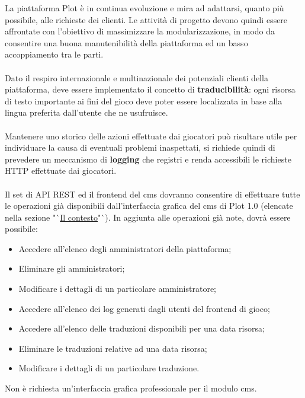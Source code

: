La piattaforma Plot è in continua evoluzione e mira ad adattarsi, quanto più possibile, alle richieste dei clienti. Le attività di progetto devono quindi essere affrontate con l'obiettivo di massimizzare la modularizzazione, in modo da consentire una buona manutenibilità della piattaforma ed un basso accoppiamento tra le parti.
\\ \\
Dato il respiro internazionale e multinazionale dei potenziali clienti della piattaforma, deve essere implementato il concetto di \textbf{traducibilità}: ogni risorsa di testo importante ai fini del gioco deve poter essere localizzata in base alla lingua preferita dall'utente che ne usufruisce.
\\ \\
Mantenere uno storico delle azioni effettuate dai giocatori può risultare utile per individuare la causa di eventuali problemi inaspettati, si richiede quindi di prevedere un meccanismo di \textbf{logging} che registri e renda accessibili le richieste HTTP effettuate dai giocatori.
\\ \\
Il set di API REST ed il \gls{frontend}\glsfirstoccur{} del \gls{cms}\glsfirstoccur{} dovranno consentire di effettuare tutte le operazioni già disponibili dall'interfaccia grafica del \gls{cms}\glsfirstoccur{} di Plot 1.0 (elencate nella sezione "`\hyperref[sec:hello]{Il contesto}"`). 
In aggiunta alle operazioni già note, dovrà essere possibile:
\begin{itemize}
	\item Accedere all'elenco degli amministratori della piattaforma;
	\item Eliminare gli amministratori;
	\item Modificare i dettagli di un particolare amministratore;
	\item Accedere all'elenco dei log generati dagli utenti del \gls{frontend}\glsfirstoccur{} di gioco;
	\item Accedere all'elenco delle traduzioni disponibili per una data risorsa;
	\item Eliminare le traduzioni relative ad una data risorsa;
	\item Modificare i dettagli di un particolare traduzione.
\end{itemize}

Non è richiesta un'interfaccia grafica professionale per il modulo \gls{cms}\glsfirstoccur{}.

